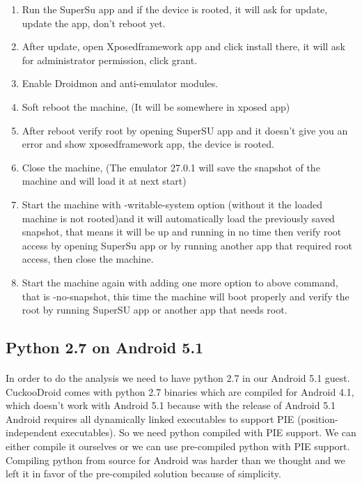 \documentclass[../main.tex]{subfile}
\begin{document}
\begin{enumerate}
		\item Run the SuperSu app and if the device is rooted, it will ask for update, update the app, don't reboot yet.
		\item After update, open Xposedframework app and click install there, it will ask for administrator permission, click grant.
		\item Enable Droidmon and anti-emulator modules.
		\item Soft reboot the machine, (It will be somewhere in xposed app)
		\item After reboot verify root by opening SuperSU app and it doesn't give you an error and show xposedframework app, the device is rooted.
		\item Close the machine, (The emulator 27.0.1 will save the snapshot of the machine and will load it at next start)
		\item Start the machine with -writable-system option (without it the loaded machine is not rooted)and it will automatically load the previously saved snapshot, that means it will be up and running in no time then verify root access by opening SuperSu app or by running another app that required root access, then close the machine.
		\item Start the machine again with adding one more option to above command, that is -no-snapshot, this time the machine will boot properly and verify the root by running SuperSU app or another app that needs root.
					
		\end{enumerate}
		\subsection{Python 2.7 on Android 5.1} \label{sec:android_5.1_python}
		\paragraph{} In order to do the analysis we need to have python 2.7 in our Android 5.1 guest. CuckooDroid comes with python 2.7 binaries which are compiled for Android 4.1, which doesn't work with Android 5.1 because with the release of Android 5.1 Android requires all dynamically linked executables to support PIE (position-independent executables). So we need python compiled with PIE support. We can either compile it ourselves or we can use pre-compiled python with PIE support. Compiling python from source for Android was harder than we thought and we left it in favor of the pre-compiled solution because of simplicity. 
		
\end{document}
